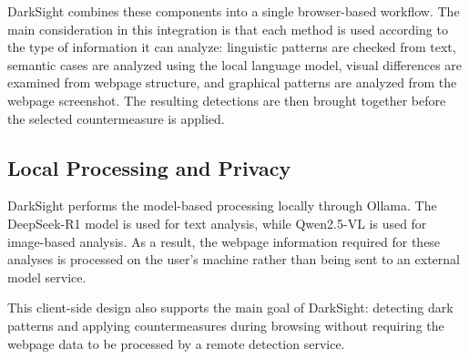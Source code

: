\documentclass[11pt,a4paper]{article}
\begin{document}
DarkSight combines these components into a single browser-based workflow. The main consideration in this integration is that each method is used according to the type of information it can analyze: linguistic patterns are checked from text, semantic cases are analyzed using the local language model, visual differences are examined from webpage structure, and graphical patterns are analyzed from the webpage screenshot. The resulting detections are then brought together before the selected countermeasure is applied.

\subsection{Local Processing and Privacy}
\label{subsec:privacy}

DarkSight performs the model-based processing locally through Ollama. The DeepSeek-R1 model is used for text analysis, while Qwen2.5-VL is used for image-based analysis. As a result, the webpage information required for these analyses is processed on the user's machine rather than being sent to an external model service.

This client-side design also supports the main goal of DarkSight: detecting dark patterns and applying countermeasures during browsing without requiring the webpage data to be processed by a remote detection service.
\end{document}
